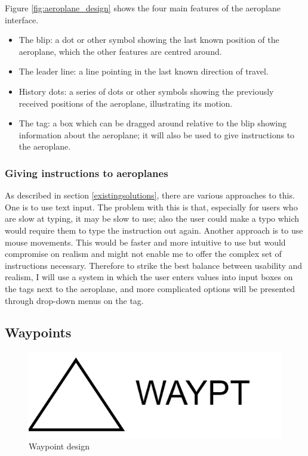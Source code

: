 \documentclass{article}
\begin{document}
Figure \ref{fig:aeroplane_design} shows the four main features of the aeroplane interface.
\begin{itemize}
    \item The blip: a dot or other symbol showing the last known position of the aeroplane, which the other features are centred around.
    \item The leader line: a line pointing in the last known direction of travel.
    \item History dots: a series of dots or other symbols showing the previously received positions of the aeroplane, illustrating its motion.
    \item The tag: a box which can be dragged around relative to the blip showing information about the aeroplane; it will also be used to give instructions to the aeroplane.
\end{itemize}

\subsubsection{Giving instructions to aeroplanes}
As described in section \ref{existingsolutions}, there are various approaches to this.
One is to use text input.
The problem with this is that, especially for users who are slow at typing, it may be slow to use; also the user could make a typo which would require them to type the instruction out again.
Another approach is to use mouse movements.
This would be faster and more intuitive to use but would compromise on realism and might not enable me to offer the complex set of instructions necessary.
Therefore to strike the best balance between usability and realism, I will use a system in which the user enters values into input boxes on the tags next to the aeroplane, and more complicated options will be presented through drop-down menus on the tag.


\subsection{Waypoints}
\begin{figure}[H]
\centering
\includegraphics{diagrams/waypointdesign.png}
\caption{\label{fig:waypointdesign}Waypoint design}
\end{figure}
\end{document}
